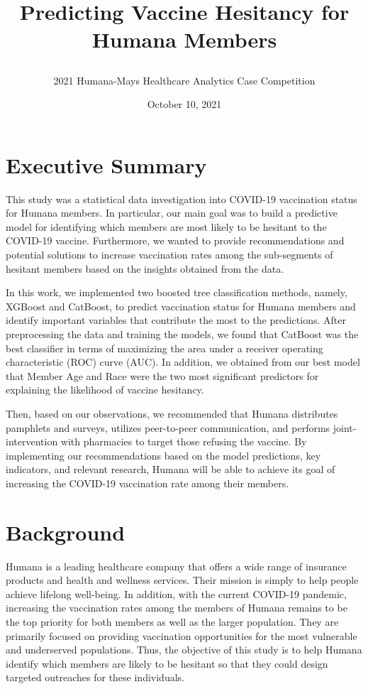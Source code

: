 \documentclass[
  12pt,
]{article}
\title{\vspace{5cm}

Predicting Vaccine Hesitancy for Humana Members}
\author{2021 Humana-Mays Healthcare Analytics Case Competition}
\date{October 10, 2021}
\begin{document}
\maketitle

\newpage
\tableofcontents

\newpage

\hypertarget{executive-summary}{%
\section{Executive Summary}\label{executive-summary}}

This study was a statistical data investigation into COVID-19
vaccination status for Humana members. In particular, our main goal was
to build a predictive model for identifying which members are most
likely to be hesitant to the COVID-19 vaccine. Furthermore, we wanted to
provide recommendations and potential solutions to increase vaccination
rates among the sub-segments of hesitant members based on the insights
obtained from the data.

In this work, we implemented two boosted tree classification methods,
namely, XGBoost and CatBoost, to predict vaccination status for Humana
members and identify important variables that contribute the most to the
predictions. After preprocessing the data and training the models, we
found that CatBoost was the best classifier in terms of maximizing the
area under a receiver operating characteristic (ROC) curve (AUC). In
addition, we obtained from our best model that Member Age and Race were
the two most significant predictors for explaining the likelihood of
vaccine hesitancy.

Then, based on our observations, we recommended that Humana distributes
pamphlets and surveys, utilizes peer-to-peer communication, and performs
joint-intervention with pharmacies to target those refusing the vaccine.
By implementing our recommendations based on the model predictions, key
indicators, and relevant research, Humana will be able to achieve its
goal of increasing the COVID-19 vaccination rate among their members.

\newpage

\hypertarget{background}{%
\section{Background}\label{background}}

Humana is a leading healthcare company that offers a wide range of
insurance products and health and wellness services. Their mission is
simply to help people achieve lifelong well-being. In addition, with the
current COVID-19 pandemic, increasing the vaccination rates among the
members of Humana remains to be the top priority for both members as
well as the larger population. They are primarily focused on providing
vaccination opportunities for the most vulnerable and underserved
populations. Thus, the objective of this study is to help Humana
identify which members are likely to be hesitant so that they could
design targeted outreaches for these individuals.
\end{document}
